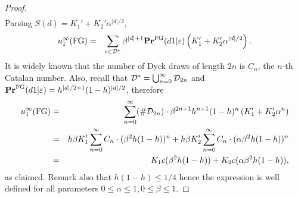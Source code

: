 \begin{proof}
\begin{eqnarray*}
\end{eqnarray*}
Parsing $S(d)=K_1'+K_2'\alpha^{|d|/2}$, 
\begin{eqnarray*}
u^\infty_1(\text{\rm FG}) &=& \sum_{e\in \mathcal{D}^\ast}\beta^{|d|+1}\mathbf{Pr}^{\text{\rm FG}}(d1|\varepsilon)\left(K_1'+K_2'\alpha^{|d|/2}\right).
\end{eqnarray*}
It is widely known that the number of Dyck draws of length $2n$ is $C_n$, the $n$-th Catalan number. Also, recall that $\mathcal{D}^\ast = \bigcup_{n=0}^{\infty} \mathcal{D}_{2n}$ and $\mathbf{Pr}^{\text{\rm FG}}(d1|\varepsilon)=h^{|d|/2+1}(1-h)^{|d|/2}$, therefore
\begin{eqnarray*}
u^\infty_1(\text{\rm FG})	&=& \sum_{n=0}^{\infty}(\#  \mathcal{D}_{2n})\cdot\beta^{2n+1}h^{n+1}(1-h)^{n}\left(K_1'+K_2'\alpha^{n}\right)\\
	&=& h\beta K_1'\sum_{n=0}^{\infty}C_n\cdot (\beta^{2}h(1-h))^{n} + h\beta K_2'\sum_{n=0}^{\infty}C_n\cdot (\alpha\beta^{2}h(1-h))^{n}\\
    &=& K_1c(\beta^2 h(1-h)) +  K_2c(\alpha \beta^2 h(1-h)),
\end{eqnarray*}
as claimed. Remark also that $h(1-h)\leq 1/4$ hence the expression is well defined for all parameters $0\leq \alpha\leq 1,0\leq \beta\leq 1$. 
\end{proof}


